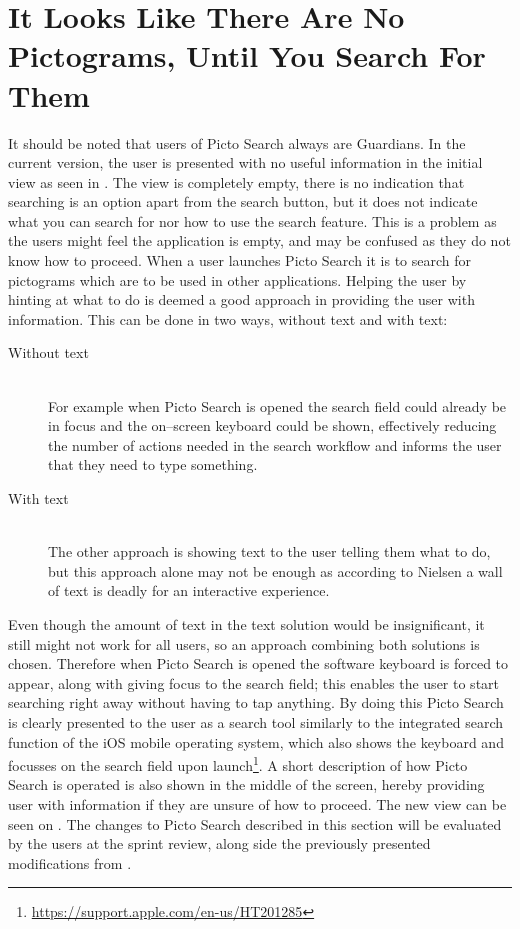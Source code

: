 \section{It Looks Like There Are No Pictograms, Until You Search For Them}\label{untilSearch}
\begin{center}
\end{center}

It should be noted that users of Picto Search always are Guardians.
In the current version, the user is presented with no useful information in the initial view as seen in .
The view is completely empty, there is no indication that searching is an option apart from the search button, but it does not indicate what you can search for nor how to use the search feature.
This is a problem as the users might feel the application is empty, and may be confused as they do not know how to proceed.
When a user launches Picto Search it is to search for pictograms which are to be used in other applications.
Helping the user by hinting at what to do is deemed a good approach in providing the user with information.
This can be done in two ways, without text and with text:
\begin{description}
    \item [Without text] \hfill\\
    For example when Picto Search is opened the search field could already be in focus and the on--screen keyboard could be shown, effectively reducing the number of actions needed in the search workflow and informs the user that they need to type something.
    \item [With text] \hfill\\
    The other approach is showing text to the user telling them what to do, but this approach alone may not be enough as according to Nielsen \cite{nielsen2003usability} a wall of text is deadly for an interactive experience.
\end{description}

Even though the amount of text in the text solution would be insignificant, it still might not work for all users, so an approach combining both solutions is chosen.
Therefore when Picto Search is opened the software keyboard is forced to appear, along with giving focus to the search field; this enables the user to start searching right away without having to tap anything.
By doing this Picto Search is clearly presented to the user as a search tool similarly to the integrated search function of the iOS mobile operating system, which also shows the keyboard and focusses on the search field upon launch\footnote{\url{https://support.apple.com/en-us/HT201285}}.
A short description of how Picto Search is operated is also shown in the middle of the screen, hereby providing user with information if they are unsure of how to proceed.
The new view can be seen on .
The changes to Picto Search described in this section will be evaluated by the users at the sprint review, along side the previously presented modifications from .
